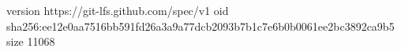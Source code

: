 version https://git-lfs.github.com/spec/v1
oid sha256:ee12e0aa7516bb591fd26a3a9a77dcb2093b7b1c7e6b0b0061ee2bc3892ca9b5
size 11068
